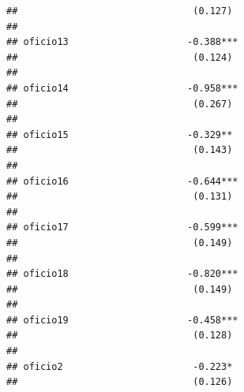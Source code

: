 \documentclass[
]{article}
\begin{document}
\begin{verbatim}
##                               (0.127)                                                               
##                                                                                                     
## oficio13                     -0.388***                                                              
##                               (0.124)                                                               
##                                                                                                     
## oficio14                     -0.958***                                                              
##                               (0.267)                                                               
##                                                                                                     
## oficio15                     -0.329**                                                               
##                               (0.143)                                                               
##                                                                                                     
## oficio16                     -0.644***                                                              
##                               (0.131)                                                               
##                                                                                                     
## oficio17                     -0.599***                                                              
##                               (0.149)                                                               
##                                                                                                     
## oficio18                     -0.820***                                                              
##                               (0.149)                                                               
##                                                                                                     
## oficio19                     -0.458***                                                              
##                               (0.128)                                                               
##                                                                                                     
## oficio2                       -0.223*                                                               
##                               (0.126)                                                               

\end{verbatim}
\end{document}

